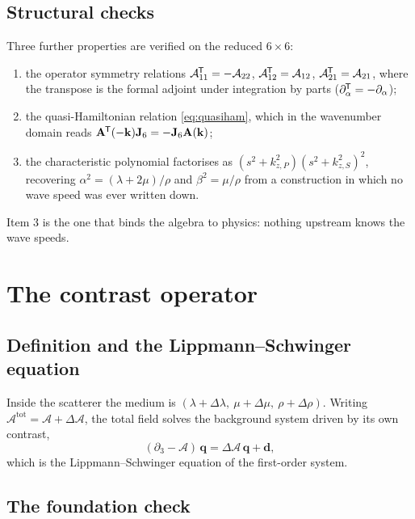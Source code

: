 \documentclass[11pt,a4paper]{article}
\newcommand{\bA}{\mathbf{A}}
\newcommand{\bq}{\mathbf{q}}
\newcommand{\bd}{\mathbf{d}}
\newcommand{\Aop}{\mathcal{A}}
\newcommand{\dA}{\Delta\mathcal{A}}
\newcommand{\Jsix}{\mathbf{J}_{6}}
\newcommand{\tp}{^{\mkern-1.5mu\mathsf{T}}}
\begin{document}
\subsection{Structural checks}\label{sec:symrel}

Three further properties are verified on the reduced $6\times6$:
\begin{enumerate}
\item the operator symmetry relations $\Aop_{11}\tp = -\Aop_{22}$,
      $\Aop_{12}\tp = \Aop_{12}$, $\Aop_{21}\tp = \Aop_{21}$, where the
      transpose is the formal adjoint under integration by parts
      ($\partial_\alpha\tp = -\partial_\alpha$);
\item the quasi-Hamiltonian relation \eqref{eq:quasiham}, which in the
      wavenumber domain reads $\bA\tp(-\mathbf{k})\Jsix = -\Jsix\bA(\mathbf{k})$;
\item the characteristic polynomial factorises as
      $(s^2 + k_{z,P}^2)(s^2 + k_{z,S}^2)^2$, recovering
      $\alpha^2 = (\lambda+2\mu)/\rho$ and $\beta^2 = \mu/\rho$ from a
      construction in which no wave speed was ever written down.
\end{enumerate}
Item 3 is the one that binds the algebra to physics: nothing upstream knows the
wave speeds.

\section{The contrast operator}

\subsection{Definition and the Lippmann--Schwinger equation}

Inside the scatterer the medium is $(\lambda+\Delta\lambda,\ \mu+\Delta\mu,\
\rho+\Delta\rho)$.  Writing $\Aop^{\text{tot}} = \Aop + \dA$, the total field
solves the background system driven by its own contrast,
\begin{equation}\label{eq:LS}
  (\partial_3 - \Aop)\,\bq = \dA\,\bq + \bd,
\end{equation}
which is the Lippmann--Schwinger equation \cite{lippmann1950} of the first-order system.

\subsection{The foundation check}
\end{document}
